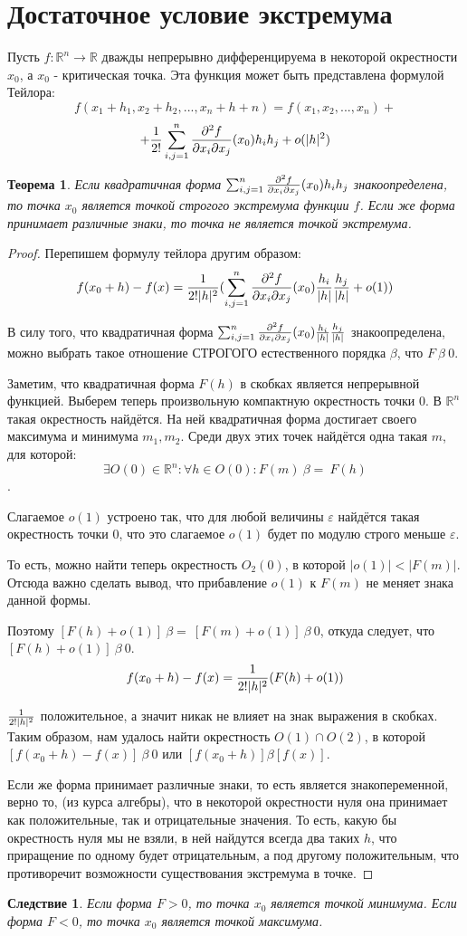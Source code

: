 \documentclass[20pt,a4paper]{extarticle}
\newtheorem*{theorem}{Теорема}
\newtheorem{consequence}{Следствие}
\newtheorem*{proof}{Доказательство}
\begin{document}
\section*{Достаточное условие экстремума}
Пусть $f: \mathbb{R}^n \to \mathbb{R}$ дважды непрерывно дифференцируема в некоторой окрестности $x_0$, а $x_0$ - критическая точка. Эта функция может быть представлена формулой Тейлора:
$$f(x_1+h_1,x_2+h_2,...,x_n+h+n)= f(x_1,x_2,...,x_n)+$$
$$+ {1 \over 2!} \sum_{i,j=1}^{n}{{\partial^2 f \over \partial x_i \partial x_j}(x_0)h_i h_j} + o(|h|^2)$$
\begin{theorem}
Если квадратичная форма $\sum_{i,j=1}^{n}{{\partial^2 f \over \partial x_i \partial x_j}(x_0)h_i h_j}$ знакоопределена, то точка $x_0$ является точкой строгого экстремума функции $f$. Если же форма принимает различные знаки, то точка не является точкой экстремума.
\end{theorem}
\begin{proof}
Перепишем формулу тейлора другим образом:
$$f(x_0+h) - f(x) = {1 \over 2!|h|^2} (\sum_{i,j=1}^{n}{\partial^2 f \over \partial x_i \partial x_j}(x_0){h_i \over |h|} {h_j \over |h|}+o(1))$$

В силу того, что квадратичная форма $\sum_{i,j=1}^{n}{\partial^2 f \over \partial x_i \partial x_j}(x_0){h_i \over |h|} {h_j \over |h|}$ знакоопределена, можно выбрать такое отношение СТРОГОГО естественного порядка $\beta$, что $F\ \beta\ 0$.

Заметим, что квадратичная форма $F(h)$ в скобках является непрерывной функцией. Выберем теперь произвольную компактную окрестность точки 0. В $\mathbb{R}^n$ такая окрестность найдётся. На ней квадратичная форма достигает своего максимума и минимума $m_1, m_2$. Среди двух этих точек найдётся одна такая $m$, для которой: $$\exists O{(0)} \in \mathbb{R}^n: \forall h \in O{(0)}: F(m)\ {\beta=}\  F(h)$$. 


Слагаемое $o(1)$ устроено так, что для любой величины $\varepsilon$ найдётся такая окрестность точки $0$, что это слагаемое $o(1)$ будет по модулю строго меньше $\varepsilon$.

То есть, можно найти теперь окрестность $O_2(0)$, в которой $|o(1)| < |F(m)|$. Отсюда важно сделать вывод, что прибавление $o(1)$ к $F(m)$ не меняет знака данной формы.


Поэтому $[F(h) + o(1)]\ \beta=\ [F(m) + o(1)]\ \beta\ 0$, откуда следует, что $[F(h) + o(1)]\ \beta\ 0$.
$$f(x_0+h) - f(x) = {1 \over 2!|h|^2} (F(h)+o(1))$$

${1 \over 2!|h|^2}$ положительное, а значит никак не влияет на знак выражения в скобках.
Таким образом, нам удалось найти окрестность $O(1) \cap O(2)$, в которой $[f(x_0 + h) - f(x)]\ \beta\ 0$ или $[f(x_0 + h)] \beta [f(x)]$.

Если же форма принимает различные знаки, то есть является знакопеременной, верно то, (из курса алгебры), что в некоторой окрестности нуля она принимает как положительные, так и отрицательные значения. То есть, какую бы окрестность нуля мы не взяли, в ней найдутся всегда два таких $h$, что приращение по одному будет отрицательным, а под другому положительным, что противоречит возможности существования экстремума в точке.
\end{proof}
\begin{consequence}
Если форма $F > 0$, то точка $x_0$ является точкой минимума. Если форма $F < 0$, то точка $x_0$ является точкой максимума.
\end{consequence}
\end{document}

